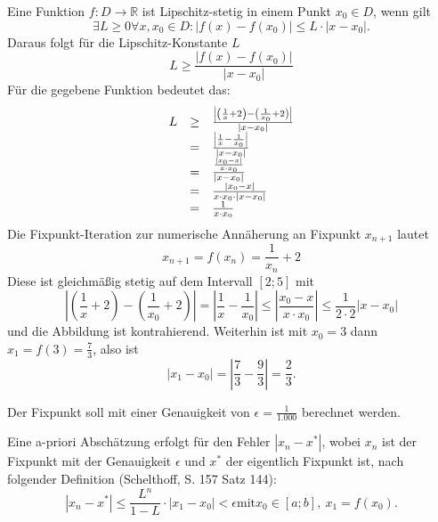\documentclass[main.tex]{subfiles}
\begin{document}
Eine Funktion $f:D\rightarrow \mathbb{R}$ ist Lipschitz-stetig in einem Punkt $x_{0} \in D$, wenn gilt
\begin{equation*}
    \exists L\geq 0\forall x,x_{0} \in D:| f( x) -f( x_{0})| \leq L\cdot | x-x_{0}| \text{.}
\end{equation*}
Daraus folgt für die Lipschitz-Konstante $L$
\begin{equation*}
    L\geq \frac{| f( x) -f( x_{0})| }{| x-x_{0}| }
\end{equation*}
Für die gegebene Funktion bedeutet das:
\begin{equation*}
    \begin{array}{ c c l }
    L & \geq  & \frac{\left| \left(\frac{1}{x} +2\right) -\left(\frac{1}{x_{0}} +2\right)\right| }{| x-x_{0}| }\\
    & = & \frac{\left| \frac{1}{x} -\frac{1}{x_{0}}\right| }{| x-x_{0}| }\\
    & = & \frac{\frac{| x_{0} -x| }{x\cdot x_{0}}}{| x-x_{0}| }\\
    & = & \frac{| x_{0} -x| }{x\cdot x_{0} \cdot | x-x_{0}| }\\
    & = & \frac{1}{x\cdot x_{0}}
    \end{array}
\end{equation*}
Die Fixpunkt-Iteration zur numerische Annäherung an Fixpunkt $x_{n+1}$ lautet
\begin{equation*}
    x_{n+1} =f( x_{n}) =\frac{1}{x_{n}} +2
\end{equation*}
Diese ist gleichmäßig stetig auf dem Intervall $\displaystyle [ 2;5]$ mit
\begin{equation*}
    \left| \left(\frac{1}{x} +2\right) -\left(\frac{1}{x_{0}} +2\right)\right| =\left| \frac{1}{x} -\frac{1}{x_{0}}\right| \leq \left| \frac{x_{0} -x}{x\cdot x_{0}}\right| \leq \frac{1}{2\cdot 2}| x-x_{0}| 
\end{equation*}
und die Abbildung ist kontrahierend. Weiterhin ist mit $x_{0} =3$ dann $x_{1} =f( 3) =\frac{7}{3}$, also ist
\begin{equation*}
    | x_{1} -x_{0}| =\left| \frac{7}{3} -\frac{9}{3}\right| =\frac{2}{3}\text{.}
\end{equation*}

Der Fixpunkt soll mit einer Genauigkeit von $\epsilon =\frac{1}{1.000}$ berechnet werden.

Eine a-priori Abschätzung erfolgt für den Fehler $\left| x_{n} -x^{*}\right| $, wobei $x_{n}$ ist der Fixpunkt mit der Genauigkeit $\epsilon $ und $x^{*}$ der eigentlich Fixpunkt ist, nach folgender Definition (Schelthoff, S. 157 Satz 144):
\begin{equation*}
    \left| x_{n} -x^{*}\right| \leq \frac{L^{n}}{1-L} \cdotp | x_{1} -x_{0}| < \epsilon \text{mit} x_{0} \in [a;b] ,\ x_{1} =f( x_{0})\text{.}
\end{equation*}
\end{document}
